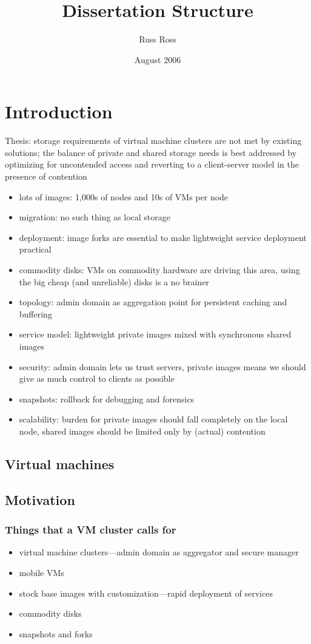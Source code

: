 \documentclass[a4paper,12pt]{article}
\title{Dissertation Structure}
\author{Russ Ross}
\date{August 2006}
\begin{document}
\maketitle

\section{Introduction}
Thesis: storage requirements of virtual machine clusters are not met by existing solutions; the balance of private and shared storage needs is best addressed by optimizing for uncontended access and reverting to a client-server model in the presence of contention
\begin{itemize}
\item lots of images: 1,000s of nodes and 10s of VMs per node
\item migration: no such thing as local storage
\item deployment: image forks are essential to make lightweight service deployment practical
\item commodity disks: VMs on commodity hardware are driving this area, using the big cheap (and unreliable) disks is a no brainer
\item topology: admin domain as aggregation point for persistent caching and buffering
\item service model: lightweight private images mixed with synchronous shared images
\item security: admin domain lets us trust servers, private images means we should give as much control to clients as possible
\item snapshots: rollback for debugging and forensics
\item scalability: burden for private images should fall completely on the local node, shared images should be limited only by (actual) contention
\end{itemize}

\subsection{Virtual machines}
\subsection{Motivation}
\subsubsection{Things that a VM cluster calls for}
\begin{itemize}
\item virtual machine clusters---admin domain as aggregator and secure manager
\item mobile VMs
\item stock base images with customization---rapid deployment of services
\item commodity disks
\item snapshots and forks
\end{itemize}
\end{document}
